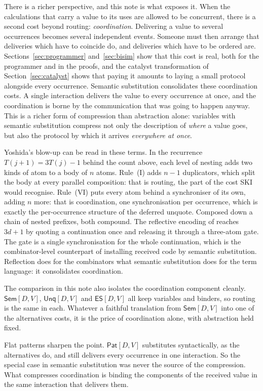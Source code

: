 \documentclass[11pt,a4paper]{article}
\theoremstyle{plain}
\theoremstyle{definition}
\theoremstyle{remark}
\newcommand{\Sem}{\textsf{Sem}[D,V]}
\newcommand{\Unq}{\textsf{Unq}[D,V]}
\newcommand{\ES}{\textsf{ES}[D,V]}
\newcommand{\Pat}{\textsf{Pat}[D,V]}
\begin{document}
There is a richer perspective, and this note is what exposes it. When the
calculations that carry a value to its uses are allowed to be concurrent,
there is a second cost beyond routing: \emph{coordination}. Delivering a value
to several occurrences becomes several independent events. Someone must then
arrange that deliveries which have to coincide do, and deliveries which have
to be ordered are. Sections~\ref{sec:programmer} and~\ref{sec:bisim} show
that this cost is real, both for the programmer and in the proofs, and the
catalyst transformation of Section~\ref{sec:catalyst} shows that paying it
amounts to laying a small protocol alongside every occurrence. Semantic
substitution consolidates these coordination costs. A single interaction
delivers the value to every occurrence at once, and the coordination is borne
by the communication that was going to happen anyway. This is a richer form of
compression than abstraction alone: variables with semantic substitution
compress not only the description of \emph{where} a value goes, but also the
protocol by which it arrives \emph{everywhere at once}.

Yoshida's blow-up can be read in these terms. In the recurrence
$T(j+1)=3T(j)-1$ behind the count above, each level of nesting adds two kinds
of atom to a body of $n$ atoms. Rule~(I) adds $n-1$ duplicators, which split
the body at every parallel composition: that is routing, the part of the cost
SKI would recognise. Rule~(VI) puts every atom behind a synchroniser of its
own, adding $n$ more: that is coordination, one synchronisation per
occurrence, which is exactly the per-occurrence structure of the deferred
unquote. Composed down a chain of nested prefixes, both compound. The
reflective encoding of \cite{RC3} reaches $3d+1$ by quoting a continuation
once and releasing it through a three-atom gate. The gate is a single
synchronisation for the whole continuation, which is the combinator-level
counterpart of installing received code by semantic substitution.
Reflection does for the combinators what semantic substitution does for the
term language: it consolidates coordination.

The comparison in this note also isolates the coordination component cleanly.
$\Sem$, $\Unq$ and $\ES$ all keep variables and binders, so routing is the
same in each. Whatever a faithful translation from $\Sem$ into one of the
alternatives costs, it is the price of coordination alone, with abstraction
held fixed.

Flat patterns sharpen the point. $\Pat$ substitutes syntactically, as the
alternatives do, and still delivers every occurrence in one interaction. So
the special case in semantic substitution was never the source of the
compression. What compresses coordination is binding the components of the
received value in the same interaction that delivers them.
\end{document}

